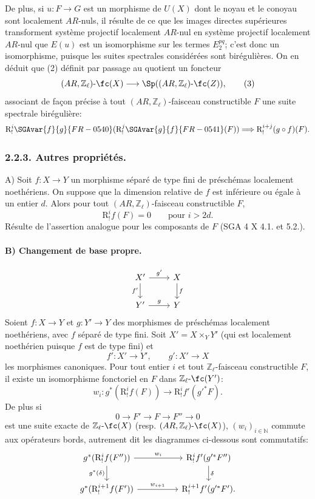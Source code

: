 De plus, si \(u:F\to G\) est un morphisme de \(U(X)\) dont le noyau et le conoyau sont localement \(AR\)-nuls, il résulte de ce que les images directes supérieures transforment système projectif localement \(AR\)-nul en système projectif localement \(AR\)-nul que \(E(u)\) est un isomorphisme sur les termes \(E_2^{pq}\); c'est donc un isomorphisme, puisque les suites spectrales considérées sont birégulières. On en déduit que (2) définit par passage au quotient un foncteur
\[
(AR,\mathbb{Z}_\ell)\text{-}\fc(X)
\longrightarrow \Sp((AR,\mathbb{Z}_\ell)\text{-}\fc(Z)),
\tag{3}
\]
associant de façon précise à tout \((AR,\mathbb{Z}_\ell)\)-faisceau constructible \(F\) une suite spectrale birégulière:
\[
\mathrm{R}^i_!\SGAvar{f}{g}{FR-0540}(\mathrm{R}^j_!\SGAvar{g}{f}{FR-0541}(F))\Longrightarrow \mathrm{R}^{i+j}_!(g\circ f)(F).
\]

\subsubsection*{2.2.3. Autres propriétés.}

A) Soit \(f:X\to Y\) un morphisme séparé de type fini de préschémas localement noethériens. On suppose que la dimension relative de \(f\) est inférieure ou égale à un entier \(d\). Alors pour tout \((AR,\mathbb{Z}_\ell)\)-faisceau constructible \(F\),
\[
\mathrm{R}^i_!f(F)=0\qquad\text{pour }i>2d.
\]
Résulte de l'assertion analogue pour les composants de \(F\) (SGA 4 X 4.1. et 5.2.).

\paragraph{B) Changement de base propre.}
\[
\begin{tikzcd}
X' \arrow[r,"g'"] \arrow[d,"f'"'] & X \arrow[d,"f"]\\
Y' \arrow[r,"g"] & Y
\end{tikzcd}
\]
Soient \(f:X\to Y\) et \(g:Y'\to Y\) des morphismes de préschémas localement noethériens, avec \(f\) séparé de type fini. Soit \(X'=X\times_Y Y'\) (qui est localement noethérien puisque \(f\) est de type fini) et
\[
f':X'\to Y',\qquad g':X'\to X
\]
les morphismes canoniques. Pour tout entier \(i\) et tout \(\mathbb{Z}_\ell\)-faisceau constructible \(F\), il existe un isomorphisme fonctoriel en \(F\) dans \(\mathbb{Z}_\ell\text{-}\fc(Y')\):
\[
w_i:g^*(\mathrm{R}^i_!f(F))\longrightarrow \mathrm{R}^i_!f'(g'^*F).
\]
De
plus si
\[
0\longrightarrow F'\longrightarrow F\longrightarrow F''\longrightarrow 0
\]
est une suite exacte de \(\mathbb{Z}_\ell\text{-}\fc(X)\) (resp. \((AR,\mathbb{Z}_\ell)\text{-}\fc(X)\)), \((w_i)_{i\in\mathbb{N}}\) commute aux opérateurs bords, autrement dit les diagrammes ci-dessous sont commutatifs:
\[
\begin{tikzcd}[column sep=huge]
g^*(\mathrm{R}^i_!f(F'')) \arrow[r,"w_i"] \arrow[d,"g^*(\delta)"']
&
\mathrm{R}^i_!f'(g'^*F'') \arrow[d,"\delta"]\\
g^*(\mathrm{R}^{i+1}_!f(F')) \arrow[r,"w_{i+1}"]
&
\mathrm{R}^{i+1}_!f'(g'^*F').
\end{tikzcd}
\]

